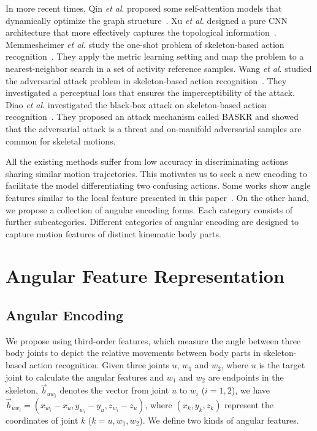 \documentclass[journal,comsoc]{IEEEtran}
\newcommand{\etal}{\textit{et al}. }
\begin{document}
In more recent times, Qin \etal proposed some self-attention models that dynamically optimize the graph structure~\cite{qin2022efficient}. Xu \etal designed a pure CNN architecture that more effectively captures the topological information~\cite{xu2022topology}. Memmesheimer \etal study the one-shot problem of skeleton-based action recognition~\cite{memmesheimer2022skeleton}. They apply the metric learning setting and map the problem to a nearest-neighbor search in a set of activity reference samples. Wang \etal studied the adversarial attack problem in skeleton-based action recognition~\cite{wang2021understanding}. They investigated a perceptual loss that ensures the imperceptibility of the attack. Diao \etal investigated the black-box attack on skeleton-based action recognition~\cite{diao2021basar}. They proposed an attack mechanism called BASKR and showed that the adversarial attack is a threat and on-manifold adversarial samples are common for skeletal motions. 

All the existing methods suffer from low accuracy in discriminating actions sharing similar motion trajectories. This motivates us to seek a new encoding to facilitate the model differentiating two confusing actions. Some works show angle features similar to the local feature presented in this paper~\cite{hu2022skeleton,yadav2022skeleton}. On the other hand, we propose a collection of angular encoding forms. Each category consists of further subcategories. Different categories of angular encoding are designed to capture motion features of distinct kinematic body parts. 


 \section{Angular Feature Representation}
\subsection{Angular Encoding}

We propose using third-order features, which measure the angle between three body joints to depict the relative movements between body parts in skeleton-based action recognition. Given three joints $u$, $w_1$ and $w_2$, where $u$ is the target joint to calculate the angular features and $w_1$ and $w_2$ are endpoints in the skeleton, 
$\vec{b}_{uw_i}$ denotes the vector from joint $u$ to $w_i$ ($i = 1, 2$), we have $\vec{b}_{uw_i} = (x_{w_i} - x_u, y_{w_i} - y_u, z_{w_i} - z_u)$, where $(x_k,y_k,z_k)$ represent the coordinates of joint $k$ ($k=u, w_1, w_2$). We define two kinds of angular features. 
\end{document}
